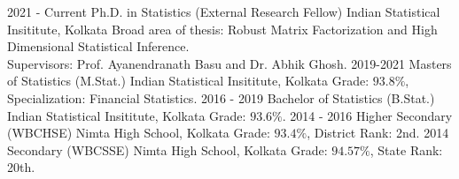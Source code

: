 \documentclass[9pt]{developercv} %
\begin{document}
\vspace{-10 pt}
\begin{entrylist}
    \entry
		{2021 - Current}
		{Ph.D. in Statistics (External Research Fellow)}
		{Indian Statistical Insititute, Kolkata}
		{Broad area of thesis: Robust Matrix Factorization and High Dimensional Statistical Inference. \\
        Supervisors: Prof. Ayanendranath Basu and Dr. Abhik Ghosh.}
    \entry
		{2019-2021}
		{Masters of Statistics (M.Stat.)}
		{Indian Statistical Insititute, Kolkata}
		{Grade: $93.8\%$, Specialization: Financial Statistics.}
    \entry
		{2016 - 2019}
		{Bachelor of Statistics (B.Stat.)}
		{Indian Statistical Insititute, Kolkata}
		{Grade: $93.6\%$.}
	\entry
		{2014 - 2016}
		{Higher Secondary (WBCHSE)}
		{Nimta High School, Kolkata}
		{Grade: $93.4\%$, District Rank: 2nd.}
	\entry
		{2014}
		{Secondary (WBCSSE)}
		{Nimta High School, Kolkata}
		{Grade: $94.57\%$, State Rank: 20th.}
\end{entrylist}
\end{document}
